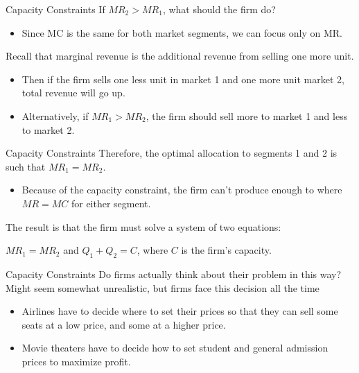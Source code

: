 \documentclass{beamer}
\begin{document}
\begin{frame}{Capacity Constraints}
  If $MR_2 > MR_1$, what should the firm do?

  \begin{itemize}
    \item Since MC is the same for both market segments, we can focus only on MR.
  \end{itemize}
  
  \bigskip
  Recall that marginal revenue is the additional revenue from selling one more unit.

  \begin{itemize}
    \item Then if the firm sells one less unit in market 1 and one more unit market 2, total revenue will go up.
    \item Alternatively, if $MR_1>MR_2$, the firm should sell more to market 1 and less to market 2.
  \end{itemize}
\end{frame}

\begin{frame}{Capacity Constraints}
  Therefore, the optimal allocation to segments 1 and 2 is such that $MR_1 = MR_2$.

  \begin{itemize}
    \item Because of the capacity constraint, the firm can't produce enough to where $MR=MC$ for either segment.
  \end{itemize}

  \bigskip
  The result is that the firm must solve a system of two equations:

  $MR_1 = MR_2$ and $Q_1 + Q_2 = C$, where $C$ is the firm's capacity.
\end{frame}

\begin{frame}{Capacity Constraints}
  Do firms actually think about their problem in this way? Might seem somewhat unrealistic, but firms face this decision all the time

  \begin{itemize}
    \item Airlines have to decide where to set their prices so that they can sell some seats at a low price, and some at a higher price.
    \item Movie theaters have to decide how to set student and general admission prices to maximize profit.
  \end{itemize}
\end{frame}
\end{document}
